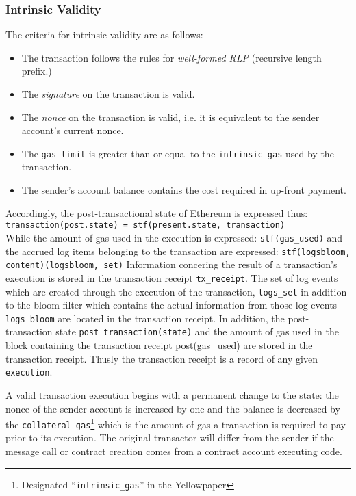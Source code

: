 \documentclass[10pt,a4paper,leqno,bibliography=totoc]{scrartcl}
\newenvironment{alphafootnotes}
{\par\edef\savedfootnotenumber{\number\value{footnote}}
\renewcommand{\thefootnote}{\alph{footnote}}
\setcounter{footnote}{0}}
{\par\setcounter{footnote}{\savedfootnotenumber}}
\begin{document}
\begin{alphafootnotes}
\begin{multicols*}{2}
			\subsubsection{Intrinsic Validity}
				The criteria for intrinsic validity are as follows:
				\begin{itemize}
				\item The transaction follows the rules for \textsl{well-formed RLP} (recursive length prefix.)
				\item The \textsl{signature} on the transaction is valid.
				\item The \textsl{nonce} on the transaction is valid, i.e. it is equivalent to the sender account's current nonce.
				\item The \texttt{gas\_limit} is greater than or equal to the \texttt{intrinsic\_gas} used by the transaction.
				\item The sender's account balance contains the cost required in up-front payment.
				\end{itemize}

				Accordingly, the post-transactional state of Ethereum is expressed thus: 
				\\
				\texttt{transaction(post.state) = stf(present.state, transaction)}  
				\\
				While the amount of gas used in the execution is expressed: \texttt{stf(gas\_used)} and the accrued log items belonging to the transaction are expressed: \texttt{stf(logsbloom, content)(logsbloom, set)} Information concering the result of a transaction's execution is stored in the transaction receipt \texttt{tx\_receipt}. The set of log events which are created through the execution of the transaction, \texttt{logs\_set} in addition to the bloom filter which contains the actual information from those log events \texttt{logs\_bloom} are located in the transaction receipt. In addition, the post-transaction state \texttt{post\_transaction(state)} and the amount of gas used in the block containing the transaction receipt post(gas\_used) are stored in the transaction receipt. Thusly the transaction receipt is a record of any given \texttt{execution}. \par

																			A valid transaction execution begins with a permanent change to the state: the nonce of the sender account is increased by one and the balance is decreased by the \texttt{collateral\_gas}\footnote{Designated ``\texttt{intrinsic\_gas}'' in the Yellowpaper} which is the amount of gas a transaction is required to pay prior to its execution. The original transactor will differ from the sender if the message call or contract creation comes from a contract account executing code. 

\end{multicols*}
\end{alphafootnotes}
\end{document}
